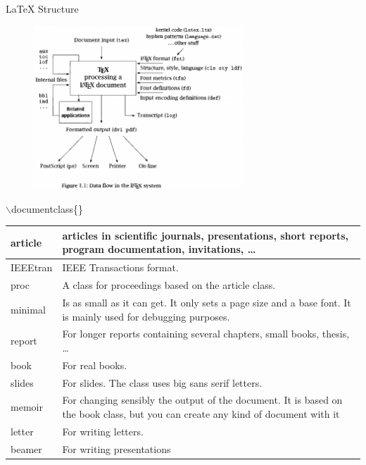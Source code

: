 \documentclass[10pt,times]{beamer}
\begin{document}
\begin{frame}{LaTeX Structure}
\begin{figure}
\centering
\includegraphics[width=0.7\textwidth]{figs/LaTeX.png}
\end{figure}
\end{frame}


\begin{frame}{$\backslash$documentclass\{\}}

\begin{table}
\begin{tabular}{|l|p{}|}
\hline
article & articles in scientific journals, presentations, short reports, program documentation, invitations, \dots \\ \hline
IEEEtran & IEEE Transactions format.\\ \hline
proc & A class for proceedings based on the article class.\\ \hline
minimal & Is as small as it can get. It only sets a page size and a base font. It is mainly used for debugging purposes.\\ \hline
report & For longer reports containing several chapters, small books, thesis, \dots \\ \hline
book & For real books.\\ \hline
slides & For slides. The class uses big sans serif letters.\\ \hline
memoir & For changing sensibly the output of the document. It is based on the book class, but you can create any kind of document with it\\ \hline
letter & For writing letters. \\ \hline
beamer& For writing presentations \\ \hline
\end{tabular}
\end{table}
\end{frame}
\end{document}
